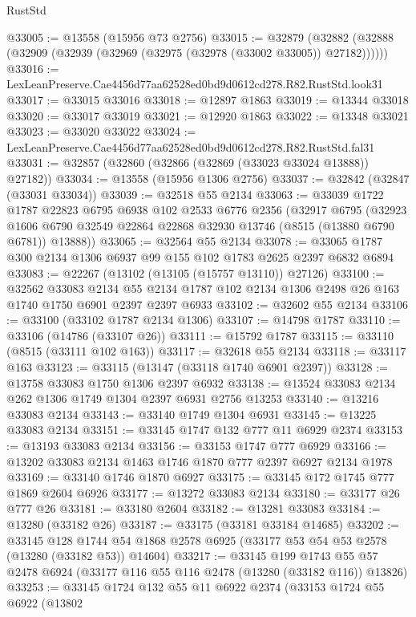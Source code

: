 \begin{lexlean}{RustStd}
\begin{coremodule}
@33005 := @13558 (@15956 @73 @2756)
@33015 := @32879
    (@32882 (@32888 (@32909 (@32939 (@32969 (@32975 (@32978 (@33002 @33005)) @27182))))))
@33016 := LexLeanPreserve.Cae4456d77aa62528ed0bd9d0612cd278.R82.RustStd.look31
@33017 := @33015 @33016
@33018 := @12897 @1863
@33019 := @13344 @33018
@33020 := @33017 @33019
@33021 := @12920 @1863
@33022 := @13348 @33021
@33023 := @33020 @33022
@33024 := LexLeanPreserve.Cae4456d77aa62528ed0bd9d0612cd278.R82.RustStd.fal31
@33031 := @32857 (@32860 (@32866 (@32869 (@33023 @33024 @13888)) @27182))
@33034 := @13558 (@15956 @1306 @2756)
@33037 := @32842 (@32847 (@33031 @33034))
@33039 := @32518 @55 @2134
@33063 := @33039
    @1722
    @1787
    @22823
    @6795
    @6938
    @102
    @2533
    @6776
    @2356
    (@32917
      @6795
      (@32923 @1606 @6790 @32549 @22864 @22868 @32930 @13746 (@8515 (@13880 @6790 @6781)) @13888))
@33065 := @32564 @55 @2134
@33078 := @33065 @1787 @300 @2134 @1306 @6937 @99 @155 @102 @1783 @2625 @2397 @6832 @6894
@33083 := @22267 (@13102 (@13105 (@15757 @13110)) @27126)
@33100 := @32562
    @33083
    @2134
    @55
    @2134
    @1787
    @102
    @2134
    @1306
    @2498
    @26
    @163
    @1740
    @1750
    @6901
    @2397
    @2397
    @6933
@33102 := @32602 @55 @2134
@33106 := @33100 (@33102 @1787 @2134 @1306)
@33107 := @14798 @1787
@33110 := @33106 (@14786 (@33107 @26))
@33111 := @15792 @1787
@33115 := @33110 (@8515 (@33111 @102 @163))
@33117 := @32618 @55 @2134
@33118 := @33117 @163
@33123 := @33115 (@13147 (@33118 @1740 @6901 @2397))
@33128 := @13758 @33083 @1750 @1306 @2397 @6932
@33138 := @13524 @33083 @2134 @262 @1306 @1749 @1304 @2397 @6931 @2756 @13253
@33140 := @13216 @33083 @2134
@33143 := @33140 @1749 @1304 @6931
@33145 := @13225 @33083 @2134
@33151 := @33145 @1747 @132 @777 @11 @6929 @2374
@33153 := @13193 @33083 @2134
@33156 := @33153 @1747 @777 @6929
@33166 := @13202 @33083 @2134 @1463 @1746 @1870 @777 @2397 @6927 @2134 @1978
@33169 := @33140 @1746 @1870 @6927
@33175 := @33145 @172 @1745 @777 @1869 @2604 @6926
@33177 := @13272 @33083 @2134
@33180 := @33177 @26 @777 @26
@33181 := @33180 @2604
@33182 := @13281 @33083
@33184 := @13280 (@33182 @26)
@33187 := @33175 (@33181 @33184 @14685)
@33202 := @33145
    @128
    @1744
    @54
    @1868
    @2578
    @6925
    (@33177 @53 @54 @53 @2578 (@13280 (@33182 @53)) @14604)
@33217 := @33145
    @199
    @1743
    @55
    @57
    @2478
    @6924
    (@33177 @116 @55 @116 @2478 (@13280 (@33182 @116)) @13826)
@33253 := @33145
    @1724
    @132
    @55
    @11
    @6922
    @2374
    (@33153
      @1724
      @55
      @6922
      (@13802

\end{coremodule}
\end{lexlean}
